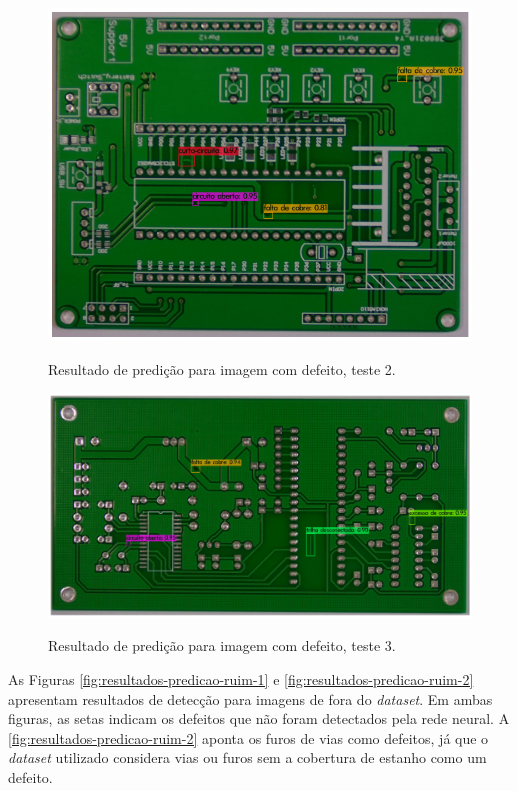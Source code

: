 \begin{figure}[H] %
  \centering
  \caption{Resultado de predição para imagem com defeito, teste 2.}
  \includegraphics[scale=0.5]{img/img-resultados-predicao-2.jpg}
  \label{fig:resultados-predicao-2}
\end{figure}

\begin{figure}[!h] %
  \centering
  \caption{Resultado de predição para imagem com defeito, teste 3.}
  \includegraphics[scale=0.45]{img/img-resultados-predicao-3.jpg}
  \label{fig:resultados-predicao-3}
\end{figure}

As Figuras \ref{fig:resultados-predicao-ruim-1} e \ref{fig:resultados-predicao-ruim-2} apresentam resultados de detecção para imagens de fora do \textit{dataset}. Em ambas figuras, as setas indicam os defeitos que não foram detectados pela rede neural.
A \autoref{fig:resultados-predicao-ruim-2} aponta os furos de vias como defeitos, já que o \textit{dataset} utilizado considera vias ou furos sem a cobertura de estanho como um defeito.

